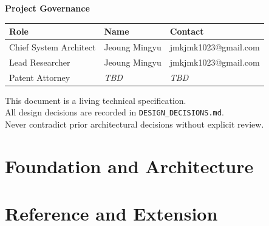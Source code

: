 ﻿\documentclass[11pt,a4paper,oneside]{book}
\theoremstyle{definition}
\theoremstyle{plain}
\theoremstyle{remark}
\theoremstyle{definition}
\begin{document}
\clearpage
\thispagestyle{empty}
\vspace*{2cm}
\begin{center}
    {\large\bfseries Project Governance}\\[1em]
\end{center}
\begin{tabular}{lll}
    \toprule
    \textbf{Role} & \textbf{Name} & \textbf{Contact} \\
    \midrule
    Chief System Architect & Jeoung Mingyu & jmkjmk1023@gmail.com \\
    Lead Researcher & Jeoung Mingyu & jmkjmk1023@gmail.com \\
    Patent Attorney & \textit{TBD} & \textit{TBD} \\
    \bottomrule
\end{tabular}
\vfill
\begin{center}
    \color{LLMWikiMuted}
    This document is a living technical specification.\\
    All design decisions are recorded in \texttt{DESIGN\_DECISIONS.md}.\\
    Never contradict prior architectural decisions without explicit review.
\end{center}

\clearpage
\tableofcontents
\clearpage
\listoffigures
\clearpage
\listoftables
\clearpage
\listofalgorithms
\clearpage
\glsaddall
\printnoidxglossaries
\clearpage
\printacronyms
\clearpage

\mainmatter

\part{Foundation and Architecture}\label{part:foundation}










\part{Reference and Extension}\label{part:reference}
\end{document}
